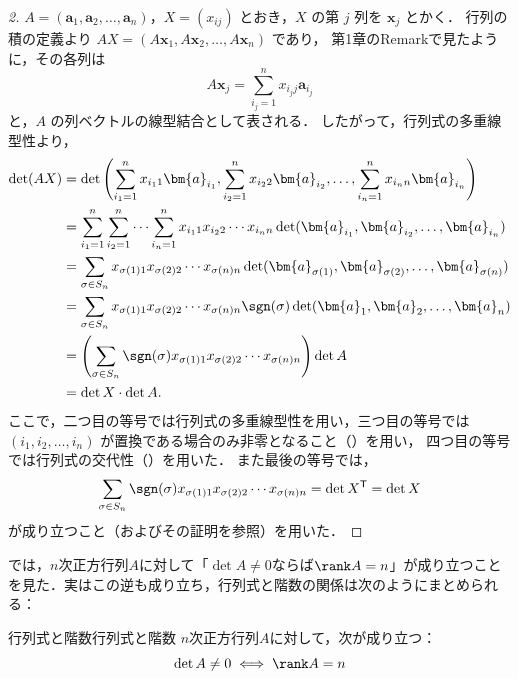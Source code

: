 \begin{leftbar}
\begin{proof}[2]
  $A=(\bm{a}_1,\bm{a}_2,\dots,\bm{a}_n)$，$X=(x_{ij})$ とおき，$X$ の第 $j$ 列を $\bm{x}_j$ とかく．
  行列の積の定義より $AX=(A\bm{x}_1,A\bm{x}_2,\dots,A\bm{x}_n)$ であり，
  第1章のRemarkで見たように，その各列は
  \[
    A\bm{x}_j=\sum_{i_j=1}^{n} x_{i_j j}\bm{a}_{i_j}
  \]
  と，$A$ の列ベクトルの線型結合として表される．
  したがって，行列式の多重線型性より，
  \begin{align*}
    \det(AX)
    &=
    \det\left(
      \sum_{i_1=1}^{n} x_{i_1 1}\bm{a}_{i_1},
      \sum_{i_2=1}^{n} x_{i_2 2}\bm{a}_{i_2},
      \dots,
      \sum_{i_n=1}^{n} x_{i_n n}\bm{a}_{i_n}
    \right) \\
    &=
    \sum_{i_1=1}^{n}\sum_{i_2=1}^{n}\dotsm\sum_{i_n=1}^{n}
    x_{i_1 1}x_{i_2 2}\dotsm x_{i_n n}
    \det(\bm{a}_{i_1},\bm{a}_{i_2},\dots,\bm{a}_{i_n}) \\
    &=
    \sum_{\sigma\in S_n}
    x_{\sigma(1)1}x_{\sigma(2)2}\dotsm x_{\sigma(n)n}
    \det(\bm{a}_{\sigma(1)},\bm{a}_{\sigma(2)},\dots,\bm{a}_{\sigma(n)}) \\
    &=
    \sum_{\sigma\in S_n}
    x_{\sigma(1)1}x_{\sigma(2)2}\dotsm x_{\sigma(n)n}
    \sgn(\sigma)\det(\bm{a}_1,\bm{a}_2,\dots,\bm{a}_n) \\
    &=
    \left(
      \sum_{\sigma\in S_n}
      \sgn(\sigma)
      x_{\sigma(1)1}x_{\sigma(2)2}\dotsm x_{\sigma(n)n}
    \right)\det A \\
    &=
    \det X \cdot \det A.
  \end{align*}
  ここで，二つ目の等号では行列式の多重線型性を用い，三つ目の等号では
  $(i_1,i_2,\dots,i_n)$ が置換である場合のみ非零となること（）を用い，
  四つ目の等号では行列式の交代性（）を用いた．
  また最後の等号では，
  \[
    \sum_{\sigma\in S_n}\sgn(\sigma)x_{\sigma(1)1}x_{\sigma(2)2}\dotsm x_{\sigma(n)n}
    =\det X^{\mathsf{T}}=\det X
  \]
  が成り立つこと（およびその証明を参照）を用いた．
\end{proof}
\end{leftbar}

では，$n$次正方行列$A$に対して「$\det A \ne 0$ならば$\rank A = n$」が成り立つことを見た．実はこの逆も成り立ち，行列式と階数の関係は次のようにまとめられる：

\begin{prop}{行列式と階数}{行列式と階数}
  $n$次正方行列$A$に対して，次が成り立つ：
  \[
  \det A \ne 0 \iff \rank A = n
  \]
\end{prop}


